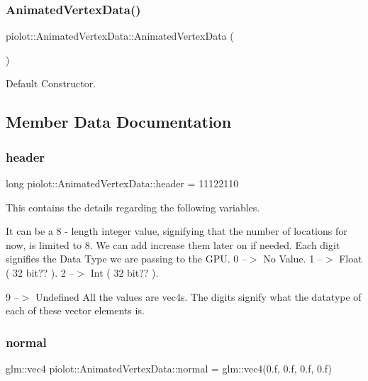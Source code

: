 \subsubsection{\texorpdfstring{Animated\+Vertex\+Data()}{AnimatedVertexData()}}
{\footnotesize\ttfamily piolot\+::\+Animated\+Vertex\+Data\+::\+Animated\+Vertex\+Data (\begin{DoxyParamCaption}{ }\end{DoxyParamCaption})\hspace{0.3cm}{\ttfamily [default]}}



Default Constructor. 



\subsection{Member Data Documentation}
\mbox{\label{structpiolot_1_1_animated_vertex_data_aceada2166f0ac3779f700d39f6eee5c1}} 
\subsubsection{\texorpdfstring{header}{header}}
{\footnotesize\ttfamily long piolot\+::\+Animated\+Vertex\+Data\+::header = 11122110}



This contains the details regarding the following variables. 

It can be a 8 -\/ length integer value, signifying that the number of locations for now, is limited to 8. We can add increase them later on if needed. Each digit signifies the Data Type we are passing to the G\+PU. 0 --$>$ No Value. 1 --$>$ Float ( 32 bit?? ). 2 --$>$ Int ( 32 bit?? ).

9 --$>$ Undefined All the values are vec4\textquotesingle{}s. The digits signify what the datatype of each of these vector elements is. \mbox{\label{structpiolot_1_1_animated_vertex_data_a42fe3afa838bcb9951849b914fd43a9d}} 
\subsubsection{\texorpdfstring{normal}{normal}}
{\footnotesize\ttfamily glm\+::vec4 piolot\+::\+Animated\+Vertex\+Data\+::normal = glm\+::vec4(0.f, 0.f, 0.f, 0.f)}



